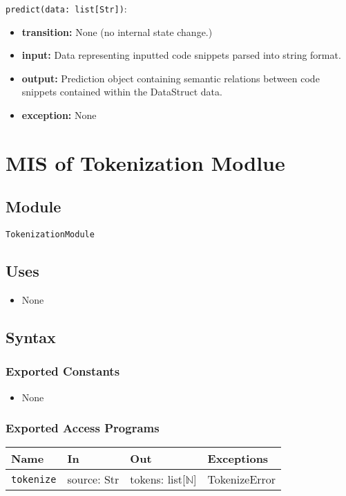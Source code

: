 \documentclass[12pt, titlepage]{article}
\begin{document}
\noindent \texttt{predict(data: list[Str])}:
\begin{itemize}
    \item \textbf{transition:} None (no internal state change.)
    \item \textbf{input:} Data representing inputted code snippets parsed into string format.
    \item \textbf{output:} Prediction object containing semantic relations between code snippets contained within the DataStruct data.
    \item \textbf{exception:} None
\end{itemize}


\section{MIS of Tokenization Modlue} \label{smTokenization}

\subsection{Module}

\texttt{TokenizationModule}

\subsection{Uses}

\begin{itemize}
    \item None
\end{itemize}

\subsection{Syntax}

\subsubsection{Exported Constants}

\begin{itemize}
    \item None
\end{itemize}

\subsubsection{Exported Access Programs}

\begin{center}
\begin{tabular}{p{5cm} p{3.5cm} p{3.5cm} p{2cm}}
\hline
\textbf{Name} & \textbf{In} & \textbf{Out} & \textbf{Exceptions} \\
\hline
\texttt{tokenize} & source: Str & tokens: list[$\mathbb{N}$] & TokenizeError \\
\hline
\end{tabular}
\end{center}
\end{document}
